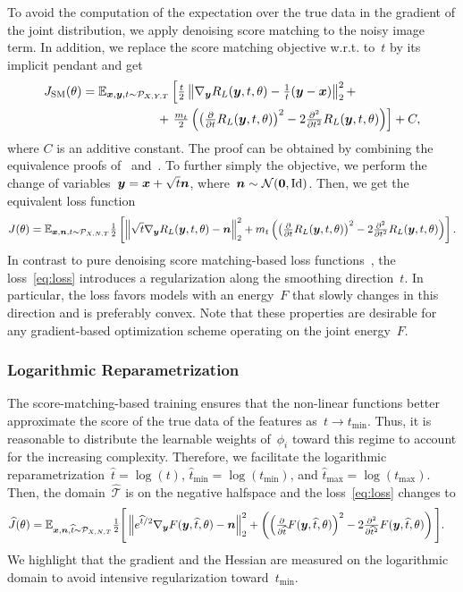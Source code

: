 \documentclass{article} %
\theoremstyle{plain}
\theoremstyle{definition}
\theoremstyle{remark}
\newcommand{\T}{\mathcal{T}}
\newcommand{\id}{\mathrm{Id}}
\newcommand{\norm}[1]{\left\Vert#1\right\Vert}
\renewcommand{\vec}[1]{\mathbf{#1}}
\newcommand{\tmin}{t_\mathrm{min}}
\newcommand{\tmax}{t_\mathrm{max}}
\def\hatt{{\widehat{t}}}
\newcommand{\tminh}{\hatt_\mathrm{min}}
\newcommand{\tmaxh}{\hatt_\mathrm{max}}
\newcommand{\dist}[1]{\mathcal{P}_{#1}}
\begin{document}
To avoid the computation of the expectation over the true data in the gradient of the joint distribution, we apply denoising score matching to the noisy image term.
In addition, we replace the score matching objective w.r.t. to~$t$ by its implicit pendant and get
\begin{align*}
J_\mathrm{SM}(\theta) &=
\E_{\vx,\vy,t\sim\dist{X,Y,T}}\left[\tfrac{t}{2}\norm{\nabla_\vy R_L(\vy,t,\theta) -\tfrac{1}{t}(\vy-\vx)}_2^2 + \right.\\
&\hspace{6em}+ \left. \tfrac{m_t}{2}\left(\left(\tfrac{\partial}{\partial t}R_L(\vy,t,\theta)\right)^2 -2\tfrac{\partial^2}{\partial t^2}R_L(\vy,t,\theta)\right)\right] + C,
\end{align*}
where $C$ is an additive constant.
The proof can be obtained by combining the equivalence proofs of~\citet{Hy05} and~\citet{Vi11}.
To further simply the objective, we perform the change of variables~${\bm{y}}={\bm{x}}+\sqrt{t}{\bm{n}}$, where~$\vn\sim\mathcal{N}(\vec{0},\id)$.
Then, we get the equivalent loss function
\begin{align} \label{eq:loss}
J(\theta)=\E_{\vx,\vn,t\sim\dist{X,N,T}}\tfrac{1}{2}\left[\norm{\sqrt{t}\nabla_\vy R_L(\vy,t,\theta) -\vn}_2^2 + m_t\left(\left(\tfrac{\partial}{\partial t}R_L(\vy,t,\theta)\right)^2 -2\tfrac{\partial^2}{\partial t^2}R_L(\vy,t,\theta)\right)\right].
\end{align}
In contrast to pure denoising score matching-based loss functions~\citep{SoEr19,HoJa20}, the loss~\eqref{eq:loss} introduces a regularization along the smoothing direction~$t$.
In particular, the loss favors models with an energy~$F$ that slowly changes in this direction and is preferably convex.
Note that these properties are desirable for any gradient-based optimization scheme operating on the joint energy~$F$.

\subsubsection{Logarithmic Reparametrization}
The score-matching-based training ensures that the non-linear functions better approximate the score of the true data of the features as~$t\to\tmin$.
Thus, it is reasonable to distribute the learnable weights of~$\phi_i$ toward this regime to account for the increasing complexity.
Therefore, we facilitate the logarithmic reparametrization~$\widehat{t}=\log(t)$, $\tminh=\log(\tmin)$, and $\tmaxh=\log(\tmax)$.
Then, the domain~$\widehat{\T}$ is on the negative halfspace and the loss~\eqref{eq:loss} changes to
\begin{align} \label{eq:losslog}
\widehat{J}(\theta)=\E_{\vx,\vn,\widehat{t}\sim\dist{X,N,T}}\tfrac12\Bigg[&\norm{e^{\widehat{t}/2}\nabla_\vy F(\vy,\widehat{t},\theta) -\vn}_2^2 + \left(\left(\tfrac{\partial}{\partial\widehat{t}}F(\vy,\widehat{t},\theta)\right)^2 -2\tfrac{\partial^2}{\partial \widehat{t}^2}F(\vy,\widehat{t},\theta)\right)\Bigg].
\end{align}
We highlight that the gradient and the Hessian are measured on the logarithmic domain to avoid intensive regularization toward~$\tmin$.
\end{document}
